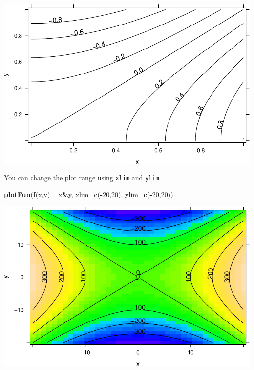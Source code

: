 \documentclass[
]{book}
\newenvironment{Shaded}{\begin{snugshade}}{\end{snugshade}}
\newcommand{\DataTypeTok}[1]{\textcolor[rgb]{0.13,0.29,0.53}{#1}}
\newcommand{\DecValTok}[1]{\textcolor[rgb]{0.00,0.00,0.81}{#1}}
\newcommand{\KeywordTok}[1]{\textcolor[rgb]{0.13,0.29,0.53}{\textbf{#1}}}
\newcommand{\NormalTok}[1]{#1}
\newcommand{\OperatorTok}[1]{\textcolor[rgb]{0.81,0.36,0.00}{\textbf{#1}}}
\newcommand{\StringTok}[1]{\textcolor[rgb]{0.31,0.60,0.02}{#1}}
\begin{document}
\includegraphics{_bookdown_files/math135_handbook_files/figure-latex/unnamed-chunk-44-1.pdf}

You can change the plot range using \texttt{xlim} and \texttt{ylim}.

\begin{Shaded}
\begin{Highlighting}[]
\KeywordTok{plotFun}\NormalTok{(}\KeywordTok{f}\NormalTok{(x,y) }\OperatorTok{~}\StringTok{ }\NormalTok{x}\OperatorTok{&}\NormalTok{y, }\DataTypeTok{xlim=}\KeywordTok{c}\NormalTok{(}\OperatorTok{-}\DecValTok{20}\NormalTok{,}\DecValTok{20}\NormalTok{), }\DataTypeTok{ylim=}\KeywordTok{c}\NormalTok{(}\OperatorTok{-}\DecValTok{20}\NormalTok{,}\DecValTok{20}\NormalTok{))}
\end{Highlighting}
\end{Shaded}

\includegraphics{_bookdown_files/math135_handbook_files/figure-latex/unnamed-chunk-45-1.pdf}
\end{document}
